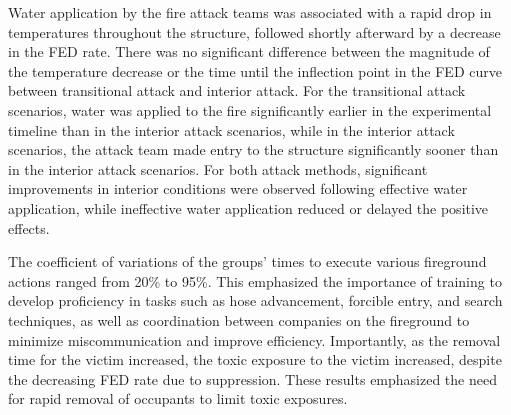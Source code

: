 \documentclass[12pt,oneside]{article}
\begin{document}
Water application by the fire attack teams was associated with a rapid drop in temperatures throughout the structure, followed shortly afterward by a decrease in the FED rate.  There was no significant difference between the magnitude of the temperature decrease or the time until the inflection point in the FED curve between transitional attack and interior attack. For the transitional attack scenarios, water was applied to the fire significantly earlier in the experimental timeline than in the interior attack scenarios, while in the interior attack   scenarios, the attack team made entry to the structure significantly sooner than in the interior attack scenarios. For both attack methods, significant improvements in interior conditions were observed following effective water application, while ineffective water application reduced or delayed the positive effects.

The coefficient of variations of the groups' times to execute various fireground actions ranged from 20\% to 95\%. This emphasized the importance of training to develop proficiency in tasks such as hose advancement, forcible entry, and search techniques, as well as coordination between companies on the fireground to minimize miscommunication and improve efficiency.  Importantly, as the removal time for the victim increased, the toxic exposure to the victim increased, despite the decreasing FED rate due to suppression.  These results emphasized the need for rapid removal of occupants to limit toxic exposures.

\end{document}
